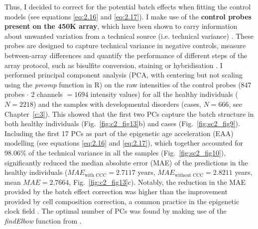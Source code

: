 Thus, I decided to correct for the potential batch effects when fitting the control models (see equations \ref{eq:2.16} and \ref{eq:2.17}). I make use of the \textbf{control probes present on the 450K array}, which have been shown to carry information about unwanted variation from a technical source (i.e. technical variance)  \citep{Maksimovic2015,Fortin2014,Gagnon-Bartsch2012}. These probes are designed to capture technical variance in negative controls, measure between-array differences and quantify the performance of different steps of the array protocol, such as bisulfite conversion, staining or hybridisation \citep{Fortin2014,Illumina2010}. I performed principal component analysis (PCA, with centering but not scaling using the \textit{prcomp} function in R) on the raw intensities of the control probes (847 probes $\cdot$ 2 channels $= 1694$ intensity values) for all the healthy individuals ($N=2218$) and the samples with developmental disorders (cases, $N=666$, see Chapter~\ref{c:3}). This showed that the first two PCs capture the batch structure in both healthy individuals (Fig.~\ref{fig:c2_fig13}b) and cases (Fig.~\ref{fig:sc2_fig9}). Including the first 17 PCs as part of the epigenetic age acceleration (EAA) modelling (see equations \ref{eq:2.16} and \ref{eq:2.17}), which together accounted for 98.06\% of the technical variance in all the samples (Fig.~\ref{fig:sc2_fig10}), significantly reduced the median absolute error (MAE) of the predictions in the healthy individuals ($MAE_{\text{with CCC}} = 2.7117$ years, $MAE_{\text{without CCC}} = 2.8211$ years, mean $MAE = 2.7664$, Fig.~\ref{fig:c2_fig13}c). Notably, the reduction in the MAE provided by the batch effect correction was higher than the improvement provided by cell composition correction, a common practice in the epigenetic clock field \citep{Chen2016,Horvath2016}. The optimal number of PCs was found by making use of the \textit{findElbow} function from \citep{Akalin2014}. 

